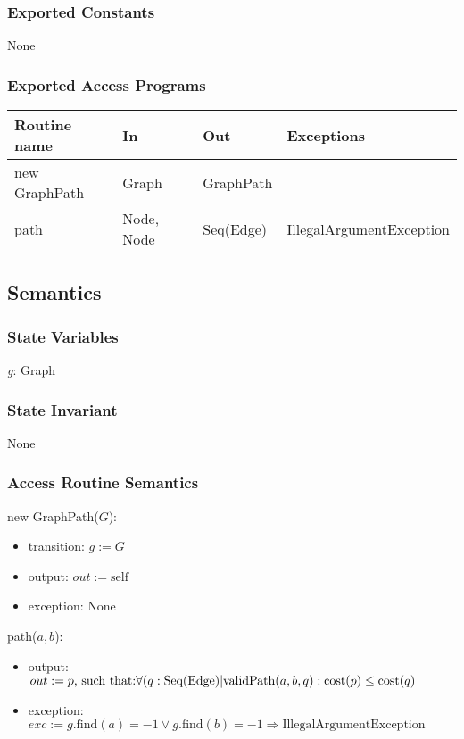 \documentclass[12pt]{article}
\begin{document}
\subsubsection*{Exported Constants}

None

\subsubsection*{Exported Access Programs}

\begin{tabular}{| l | l | l | l |}
	\hline
	\textbf{Routine name} & \textbf{In} & \textbf{Out} & \textbf{Exceptions}\\
	\hline
	new GraphPath & Graph & GraphPath & ~\\
	\hline
	path & Node, Node & Seq(Edge) & IllegalArgumentException\\
	\hline
\end{tabular}

\subsection*{Semantics}

\subsubsection*{State Variables}

\textit{g}: Graph

\subsubsection*{State Invariant}

None

\subsubsection*{Access Routine Semantics}

\noindent new GraphPath($G$):
\begin{itemize}
	\item transition: $\textit{g} := G	$
	\item output: $out := \mbox{self}$
	\item exception: None
\end{itemize}

\noindent path($a,b$):
\begin{itemize}
	\item output: $out := p \text{, such that:} \\
	\forall (q : \mbox{Seq(Edge)} | \mbox{validPath}(a,b, q) : \mbox{cost}(p) \le \mbox{cost}(q)$
	\item exception: $exc := \textit{g}.\mbox{find}(a) = -1 \lor \textit{g}.\mbox{find}(b) = -1
	 \Rightarrow \text{IllegalArgumentException}$
\end{itemize}
\end{document}
